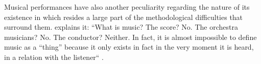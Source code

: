 \documentclass[a4paper, 12pt, openright, oneside, german, french, brazil, english, article]{abntex2}
\begin{document}
	
		
	Musical performances have also another peculiarity regarding the nature of its existence in which resides a large part of the methodological difficulties that surround them.  explains it: ``What is music? The score? No. The orchestra musicians? No. The conductor? Neither. In fact, it is almost impossible to define music as a ``thing'' because it only exists in fact in the very moment it is heard, in a relation with the listener`` \cite[p. 109]{tolila2007cultura}.
	
		
	
\end{document}
